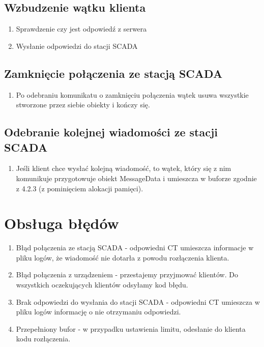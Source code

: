 \documentclass[a4paper]{article}
\begin{document}
\subsection{Wzbudzenie wątku klienta}
\begin{enumerate}
\item Sprawdzenie czy jest odpowiedź z serwera
\item Wysłanie odpowiedzi do stacji SCADA
\end{enumerate}

\subsection{Zamknięcie połączenia ze stacją SCADA}
\begin{enumerate}
\item Po odebraniu komunikatu o zamknięciu połączenia wątek usuwa wszystkie stworzone przez siebie obiekty i kończy się.
\end{enumerate}

\subsection{Odebranie kolejnej wiadomości ze stacji SCADA}
\begin{enumerate}
\item Jeśli klient chce wysłać kolejną wiadomość, to wątek, który się z nim komunikuje przygotowuje obiekt {MessageData} i umieszcza w buforze zgodnie z 4.2.3 (z pominięciem alokacji pamięci).
\end{enumerate}

\section{Obsługa błędów}
\begin{enumerate}
\item Błąd połączenia ze stacją SCADA - odpowiedni CT umieszcza informacje w pliku logów, że wiadomość nie dotarła z powodu rozłączenia klienta.
\item Błąd połączenia z urządzeniem - przestajemy przyjmować klientów. Do wszystkich oczekujących klientów odsyłamy kod błędu.
\item Brak odpowiedzi do wysłania do stacji SCADA - odpowiedni CT umieszcza w pliku logów informację o nie otrzymaniu odpowiedzi.
\item Przepełniony bufor - w przypadku ustawienia limitu, odesłanie do klienta kodu rozłączenia.
\end{enumerate}
\end{document}
